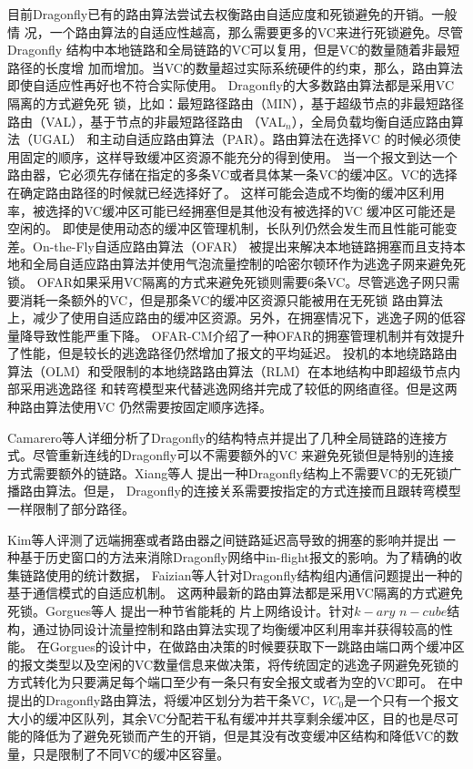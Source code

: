 目前Dragonfly已有的路由算法尝试去权衡路由自适应度和死锁避免的开销。一般情
况，一个路由算法的自适应性越高，那么需要更多的VC来进行死锁避免。尽管Dragonfly
结构中本地链路和全局链路的VC可以复用，但是VC的数量随着非最短路径的长度增
加而增加。当VC的数量超过实际系统硬件的约束，那么，路由算法即使自适应性再好也不符合实际使用。
Dragonfly的大多数路由算法都是采用VC隔离的方式避免死
锁，比如：最短路径路由（MIN），基于超级节点的非最短路径
路由（VAL），基于节点的非最短路径路由
（VAL$_{n}$），全局负载均衡自适应路由算法（UGAL）
和主动自适应路由算法（PAR）。路由算法在选择VC
的时候必须使用固定的顺序，这样导致缓冲区资源不能充分的得到使用。
当一个报文到达一个路由器，它必须先存储在指定的多条VC或者具体某一条VC的缓冲区。VC的选择
在确定路由路径的时候就已经选择好了。
这样可能会造成不均衡的缓冲区利用率，被选择的VC缓冲区可能已经拥塞但是其他没有被选择的VC 缓冲区可能还是空闲的。
即使是使用动态的缓冲区管理机制，长队列仍然会发生而且性能可能变差。On-the-Fly自适应路由算法（OFAR）
被提出来解决本地链路拥塞而且支持本地和全局自适应路由算法并使用气泡流量控制的哈密尔顿环作为逃逸子网来避免死锁。
OFAR如果采用VC隔离的方式来避免死锁则需要6条VC。尽管逃逸子网只需要消耗一条额外的VC，但是那条VC的缓冲区资源只能被用在无死锁
路由算法上，减少了使用自适应路由的缓冲区资源。另外，在拥塞情况下，逃逸子网的低容量降导致性能严重下降。
OFAR-CM介绍了一种OFAR的拥塞管理机制并有效提升了性能，但是较长的逃逸路径仍然增加了报文的平均延迟。
投机的本地绕路路由算法（OLM）和受限制的本地绕路路由算法（RLM）在本地结构中即超级节点内部采用逃逸路径
和转弯模型来代替逃逸网络并完成了较低的网络直径。但是这两种路由算法使用VC 仍然需要按固定顺序选择。

Camarero等人详细分析了Dragonfly的结构特点并提出了几种全局链路的连接方式。尽管重新连线的Dragonfly可以不需要额外的VC
来避免死锁但是特别的连接方式需要额外的链路。Xiang等人 提出一种Dragonfly结构上不需要VC的无死锁广播路由算法。但是，
Dragonfly的连接关系需要按指定的方式连接而且跟转弯模型一样限制了部分路径。

Kim等人评测了远端拥塞或者路由器之间链路延迟高导致的拥塞的影响并提出
一种基于历史窗口的方法来消除Dragonfly网络中in-flight报文的影响。为了精确的收集链路使用的统计数据，
Faizian等人针对Dragonfly结构组内通信问题提出一种的基于通信模式的自适应机制。
这两种最新的路由算法都是采用VC隔离的方式避免死锁。Gorgues等人
提出一种节省能耗的
片上网络设计。针对$k-ary$ $n-cube$结构，通过协同设计流量控制和路由算法实现了均衡缓冲区利用率并获得较高的性能。
在Gorgues的设计中，在做路由决策的时候要获取下一跳路由端口两个缓冲区的报文类型以及空闲的VC数量信息来做决策，将传统固定的逃逸子网避免死锁的方式转化为只要满足每个端口至少有一条只有安全报文或者为空的VC即可。
在中提出的Dragonfly路由算法，将缓冲区划分为若干条VC，$VC_{0}$是一个只有一个报文大小的缓冲区队列，其余VC分配若干私有缓冲并共享剩余缓冲区，目的也是尽可能的降低为了避免死锁而产生的开销，但是其没有改变缓冲区结构和降低VC的数量，只是限制了不同VC的缓冲区容量。

